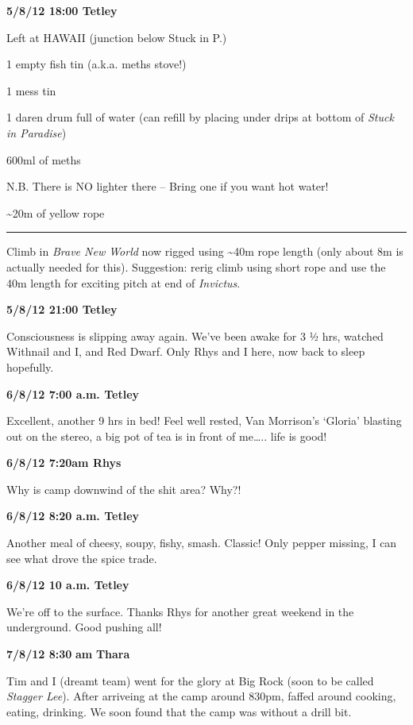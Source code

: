 \textbf{5/8/12 18:00 Tetley}

Left at HAWAII (junction below Stuck in P.)

1 empty fish tin (a.k.a. meths stove!)

1 mess tin

1 daren drum full of water (can refill by placing under drips at bottom
of \emph{Stuck in Paradise})

600ml of meths

N.B. There is NO lighter there -- Bring one if you want hot water!

\textasciitilde{}20m of yellow rope

\begin{center}\rule{0.5\linewidth}{\linethickness}\end{center}

Climb in \emph{Brave New World} now rigged using \textasciitilde{}40m
rope length (only about 8m is actually needed for this). Suggestion:
rerig climb using short rope and use the 40m length for exciting pitch
at end of \emph{Invictus}.

\textbf{5/8/12 21:00 Tetley}

Consciousness is slipping away again. We've been awake for 3 ½ hrs,
watched Withnail and I, and Red Dwarf. Only Rhys and I here, now back to
sleep hopefully.

\textbf{6/8/12 7:00 a.m. Tetley}

Excellent, another 9 hrs in bed! Feel well rested, Van Morrison's
`Gloria' blasting out on the stereo, a big pot of tea is in front of
me\ldots{}.. life is good!

\textbf{6/8/12 7:20am Rhys}

Why is camp downwind of the shit area? Why?!

\textbf{6/8/12 8:20 a.m. Tetley}

Another meal of cheesy, soupy, fishy, smash. Classic! Only pepper
missing, I can see what drove the spice trade.

\textbf{6/8/12 10 a.m. Tetley}

We're off to the surface. Thanks Rhys for another great weekend in the
underground. Good pushing all!

\textbf{7/8/12 8:30} \textbf{am} \textbf{Thara}

Tim and I (dreamt team) went for the glory at Big Rock (soon to be
called \emph{Stagger Lee}). After arriveing at the camp around 830pm,
faffed around cooking, eating, drinking. We soon found that the camp was
without a drill bit.

